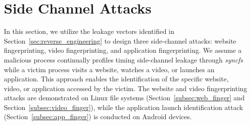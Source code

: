 \section{Side Channel Attacks}
\label{sec:side_channel}
In this section, we utilize the leakage vectors identified in Section~\ref{sec:reverse_engineering} to design three side-channel attacks: website fingerprinting, video fingerprinting, and application fingerprinting. We assume a malicious process continually profiles timing side-channel leakage through \textit{syncfs} while a victim process visits a website, watches a video, or launches an application. This approach enables the identification of the specific website, video, or application accessed by the victim. The website and video fingerprinting attacks are demonstrated on Linux file systems (Section~\ref{subsec:web_finger} and Section~\ref{subsec:video_finger}), while the application launch identification attack (Section~\ref{subsec:app_finger}) is conducted on Android devices. 








